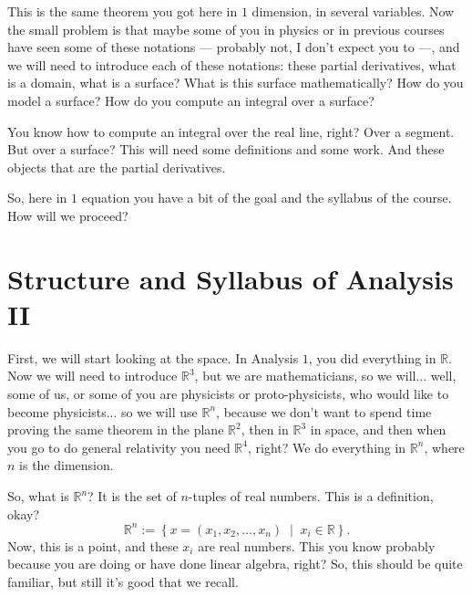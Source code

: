 \begin{spoken-clean}[00:16:15 - 00:18:20]
This is the same theorem you got here in $1$ dimension, in several variables. Now the small problem is that maybe some of you in physics or in previous courses have seen some of these notations --- probably not, I don't expect you to ---, and we will need to introduce each of these notations: these partial derivatives, what is a domain, what is a surface? What is this surface mathematically? How do you model a surface? How do you compute an integral over a surface?

You know how to compute an integral over the real line, right? Over a segment. But over a surface? This will need some definitions and some work. And these objects that are the partial derivatives.

So, here in $1$ equation you have a bit of the goal and the syllabus of the course. How will we proceed?
\end{spoken-clean}

\begin{ai-global-state-checkpoint-invisible-content}
\end{ai-global-state-checkpoint-invisible-content}

\section{Structure and Syllabus of Analysis II}

\begin{spoken-clean}[00:18:20 - 00:21:00]
First, we will start looking at the space. In Analysis $1$, you did everything in $\mathbb{R}$. Now we will need to introduce $\mathbb{R}^3$, but we are mathematicians, so we will... well, some of us, or some of you are physicists or proto-physicists, who would like to become physicists... so we will use $\mathbb{R}^n$, because we don't want to spend time proving the same theorem in the plane $\mathbb{R}^2$, then in $\mathbb{R}^3$ in space, and then when you go to do general relativity you need $\mathbb{R}^4$, right? We do everything in $\mathbb{R}^n$, where $n$ is the dimension.

So, what is $\mathbb{R}^n$? It is the set of $n$-tuples of real numbers. This is a definition, okay?
\[
\mathbb{R}^n := \left\{ x = (x_1, x_2, \dots, x_n) \;\middle|\; x_i \in \mathbb{R} \right\}.
\]
Now, this is a point, and these $x_i$ are real numbers. This you know probably because you are doing or have done linear algebra, right? So, this should be quite familiar, but still it's good that we recall.
\end{spoken-clean}

